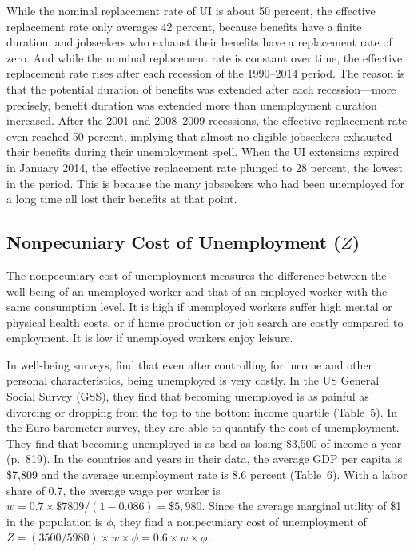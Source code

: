 \documentclass[letterpaper,12pt,leqno]{article}
\def \f{{\phi}}
\begin{document}
While the nominal replacement rate of UI is about 50 percent, the effective replacement rate only averages 42 percent, because benefits have a finite duration, and jobseekers who exhaust their benefits have a replacement rate of zero. And while the nominal replacement rate is constant over time, the effective replacement rate rises after each recession of the 1990--2014 period. The reason is that the potential duration of benefits was extended after each recession---more precisely, benefit duration was extended more than unemployment duration increased. After the 2001 and 2008--2009 recessions, the effective replacement rate even reached 50 percent, implying that almost no eligible jobseekers exhausted their benefits during their unemployment spell. When the UI extensions expired in January 2014, the effective replacement rate plunged to 28 percent, the lowest in the period. This is because the many jobseekers who had been unemployed for a long time all lost their benefits at that point.

\subsection{Nonpecuniary Cost of Unemployment ($Z$)}

The nonpecuniary cost of unemployment measures the difference between the well-being of an unemployed worker and that of an employed worker with the same consumption level. It is high if unemployed workers suffer high mental or physical health costs, or if home production or job search are costly compared to employment. It is low if unemployed workers enjoy leisure.

In well-being surveys, \citet{TMO03} find that even after controlling for income and other personal characteristics, being unemployed is very costly. In the US General Social Survey (GSS), they find that becoming unemployed is as painful as divorcing or dropping from the top to the bottom income quartile (Table~5). In the Euro-barometer survey, they are able to quantify the cost of unemployment. They find that becoming unemployed is as bad as losing \$3,500 of income a year (p.~819). In the countries and years in their data, the average GDP per capita is \$7,809 and the average unemployment rate is 8.6 percent (Table~6). With a labor share of 0.7, the average wage per worker is $w=0.7\times \$7809/(1-0.086)=\$5,980$. Since the average marginal utility of \$1 in the population is $\f$, they find a nonpecuniary cost of unemployment of $Z=(3500/5980)\times w \times \f=0.6 \times w \times \f$. 
\end{document}
